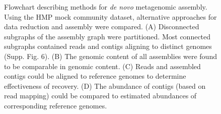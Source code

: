 \documentclass[11pt]{article} %
\begin{document}
\begin{figure}[ht]
\caption{Flowchart describing methods for \emph{de novo} metagenomic assembly.   Using the HMP
mock community dataset, alternative approaches for data reduction and assembly were compared.  
(A) Disconnected subgraphs of the assembly graph were partitioned.  Most connected subgraphs contained 
reads and contigs aligning to distinct genomes (Supp. Fig. 6). (B) The genomic content of all assemblies were 
found to be comparable in genomic content.  (C)  Reads and assembled contigs could be aligned to reference 
genomes to determine effectiveness of recovery. (D) The abundance of contigs (based on read mapping) could 
be compared to estimated abundances of corresponding reference genomes.} 
\label{flowchart}
\end{figure}
\end{document}
